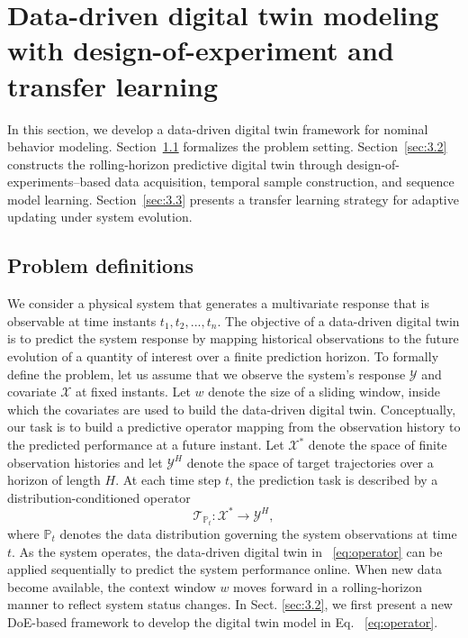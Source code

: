 \documentclass[a4paper,10pt]{cas-sc}%
\begin{document}
\section{Data-driven digital twin modeling with design-of-experiment and transfer learning}\label{sec:3}

In this section, we develop a data-driven digital twin framework for nominal behavior modeling.
Section~\ref{sec:3.1} formalizes the problem setting.
Section~\ref{sec:3.2} constructs the rolling-horizon predictive digital twin through design-of-experiments--based data acquisition, temporal sample construction, and sequence model learning.
Section~\ref{sec:3.3} presents a transfer learning strategy for adaptive updating under system evolution.

\subsection{Problem definitions}\label{sec:3.1}

We consider a physical system that generates a multivariate response that is observable at time instants $t_1, t_2,...,t_n$. The objective of a data-driven digital twin is to predict the system response by mapping historical observations to the future evolution of a quantity of interest over a finite prediction horizon.
To formally define the problem, let us assume that we observe the system's response $\mathcal{Y}$ and covariate $\mathcal{X}$ at fixed instants. Let $w$ denote the size of a sliding window, inside which the covariates are used to build the data-driven digital twin. Conceptually, our task is to build a predictive operator mapping from the observation history to the predicted performance at a future instant. Let $\mathcal{X}^{\ast}$ denote the space of finite observation histories and let $\mathcal{Y}^H$ denote the space of target trajectories over a horizon of length $H$. At each time step $t$, the prediction task is described by a distribution-conditioned operator
\begin{equation}
	\label{eq:operator}
	\mathcal{T}_{\mathbb{P}_t} : \mathcal{X}^{\ast} \rightarrow \mathcal{Y}^H,
\end{equation}
where $\mathbb{P}_t$ denotes the data distribution governing the system observations at time $t$. As the system operates, the data-driven digital twin in ~\eqref{eq:operator} can be applied sequentially to predict the system performance online. When new data become available, the context window $w$ moves forward in a rolling-horizon manner to reflect system status changes. In Sect. \ref{sec:3.2}, we first present a new DoE-based framework to develop the digital twin model in Eq. ~\eqref{eq:operator}.
\end{document}
